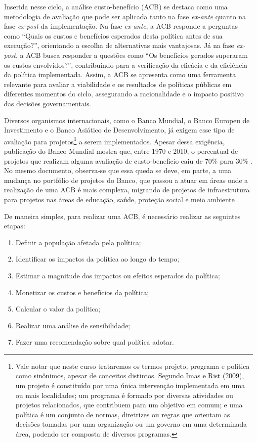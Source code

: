 \documentclass[12pt,letterpaper]{article}
\newcommand{\1}{\mathbbm{1}}
\numberwithin{equation}{section}
\begin{document}
Inserida nesse ciclo, a análise custo-benefício (ACB) se destaca como uma metodologia de avaliação que pode ser aplicada tanto na fase \textit{ex-ante} quanto na fase \textit{ex-post} da implementação. Na fase \textit{ex-ante}, a ACB responde a perguntas como “Quais os custos e benefícios esperados desta política antes de sua execução?”, orientando a escolha de alternativas mais vantajosas. Já na fase \textit{ex-post}, a ACB busca responder a questões como “Os benefícios gerados superaram os custos envolvidos?”, contribuindo para a verificação da eficácia e da eficiência da política implementada. Assim, a ACB se apresenta como uma ferramenta relevante para avaliar a viabilidade e os resultados de políticas públicas em diferentes momentos do ciclo, assegurando a racionalidade e o impacto positivo das decisões governamentais.

Diversos organismos internacionais, como o Banco Mundial, o Banco Europeu de Investimento e o Banco Asiático de Desenvolvimento, já exigem esse tipo de avaliação para projetos\footnote{Vale notar que neste curso trataremos os termos projeto, programa e política  como sinônimos, apesar de conceitos distintos.  Segundo Imas e Rist (2009), um projeto é constituído por uma única intervenção implementada em uma ou mais localidades; um programa é formado por diversas atividades ou projetos relacionados, que contribuem para um objetivo em comum; e uma política é um conjunto de normas, diretrizes ou regras  que orientam  as  decisões tomadas  por  uma organização  ou  um governo em uma determinada área, podendo ser composta de diversos programas.} a serem implementados. Apesar dessa exigência, publicação do Banco Mundial mostra que, entre 1970 e 2010, o percentual de projetos que realizam alguma avaliação de custo-benefício caiu de 70\% para 30\% \cite{world_bank_cost-benefit_2012}. No mesmo documento, observa-se que essa queda se deve, em parte, a uma mudança no portfólio de projetos do Banco, que passou a atuar em áreas onde a realização de uma ACB é mais complexa, migrando de projetos de infraestrutura para projetos nas áreas de educação, saúde, proteção social e meio ambiente \cite{world_bank_cost-benefit_2012}.

De maneira simples, para realizar uma ACB, é necessário realizar as seguintes etapas:

\begin{enumerate}
    \item Definir a população afetada pela política;
    \item Identificar os impactos da política ao longo do tempo;
    \item Estimar a magnitude dos impactos ou efeitos esperados da política;
    \item Monetizar os custos e benefícios da política;
    \item Calcular o valor da política;
    \item Realizar uma análise de sensibilidade;
    \item Fazer uma recomendação sobre qual política adotar.
\end{enumerate}
\end{document}
